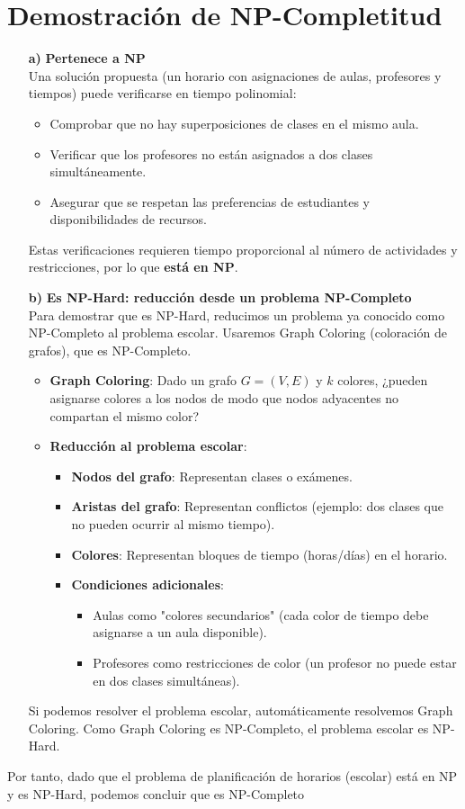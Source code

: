\documentclass[12pt, a4paper]{article}
\begin{document}
\section{Demostración de NP-Completitud}
\begin{itemize}
    \item[\textbf{a)}] \textbf{Pertenece a NP}\\
    Una solución propuesta (un horario con asignaciones de aulas, profesores y tiempos) puede verificarse en tiempo polinomial:
    \begin{itemize}
        \item Comprobar que no hay superposiciones de clases en el mismo aula.
        \item Verificar que los profesores no están asignados a dos clases simultáneamente.
        \item Asegurar que se respetan las preferencias de estudiantes y disponibilidades de recursos.
    \end{itemize}
    Estas verificaciones requieren tiempo proporcional al número de actividades y restricciones, por lo que \textbf{está en NP}.
    \item[\textbf{b)}] \textbf{Es NP-Hard: reducción desde un problema \textbf{NP-Completo}}\\
    Para demostrar que es NP-Hard, reducimos un problema ya conocido como NP-Completo al problema escolar. Usaremos Graph Coloring (coloración de grafos), que es NP-Completo.
    \begin{itemize}
        \item \textbf{Graph Coloring}: Dado un grafo $G = (V, E)$ y $k$ colores, ¿pueden asignarse colores a los nodos de modo que nodos adyacentes no compartan el mismo color?
        \item \textbf{Reducción al problema escolar}:
        \begin{itemize}
            \item \textbf{Nodos del grafo}: Representan clases o exámenes.
            \item \textbf{Aristas del grafo}: Representan conflictos (ejemplo: dos clases que no pueden ocurrir al mismo tiempo).
            \item \textbf{Colores}: Representan bloques de tiempo (horas/días) en el horario.
            \item \textbf{Condiciones adicionales}:
            \begin{itemize}
                \item Aulas como "colores secundarios" (cada color de tiempo debe asignarse a un aula disponible).
                \item Profesores como restricciones de color (un profesor no puede estar en dos clases simultáneas).
            \end{itemize}
        \end{itemize}
    \end{itemize}
    Si podemos resolver el problema escolar, automáticamente resolvemos Graph Coloring. Como Graph Coloring es NP-Completo, el problema escolar es NP-Hard.
\end{itemize}
Por tanto, dado que el problema de planificación de horarios (escolar) está en NP y es NP-Hard, podemos concluir que es NP-Completo
\end{document}
